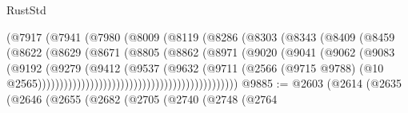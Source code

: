 \begin{lexlean}{RustStd}
\begin{coremodule}
                                        (@7917
                                          (@7941
                                            (@7980
                                              (@8009
                                                (@8119
                                                  (@8286
                                                    (@8303
                                                      (@8343
                                                        (@8409
                                                          (@8459
                                                            (@8622
                                                              (@8629
                                                                (@8671
                                                                  (@8805
                                                                    (@8862
                                                                      (@8971
                                                                        (@9020
                                                                          (@9041
                                                                            (@9062
                                                                              (@9083
                                                                                (@9192
                                                                                  (@9279
                                                                                    (@9412
                                                                                      (@9537
                                                                                        (@9632
                                                                                          (@9711
                                                                                            (@2566
                                                                                              (@9715
                                                                                                @9788)
                                                                                              (@10
                                                                                                @2565))))))))))))))))))))))))))))))))))))))))))))))
@9885 := @2603
    (@2614
      (@2635
        (@2646
          (@2655
            (@2682
              (@2705
                (@2740
                  (@2748
                    (@2764

\end{coremodule}
\end{lexlean}
